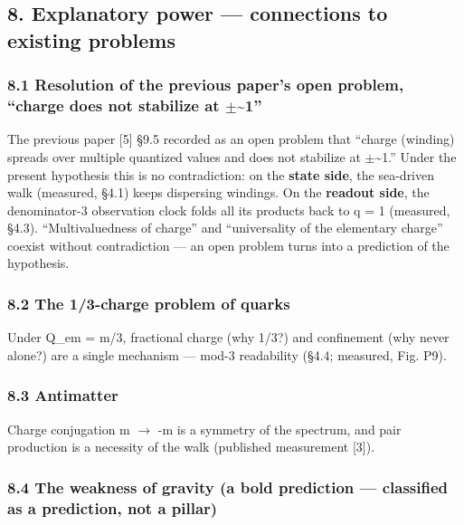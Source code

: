\documentclass[
]{article}
\begin{document}
\subsection{8. Explanatory power --- connections to existing
problems}\label{explanatory-power-connections-to-existing-problems}

\subsubsection{\texorpdfstring{8.1 Resolution of the previous paper's
open problem, ``charge does not stabilize at
\(\pm\)\textasciitilde1''}{8.1 Resolution of the previous paper's open problem, ``charge does not stabilize at \textbackslash pm\textasciitilde1''}}\label{resolution-of-the-previous-papers-open-problem-charge-does-not-stabilize-at-pm1}

The previous paper {[}5{]} §9.5 recorded as an open problem that
``charge (winding) spreads over multiple quantized values and does not
stabilize at \(\pm\)\textasciitilde1.'' Under the present hypothesis
this is no contradiction: on the \textbf{state side}, the sea-driven
walk (measured, §4.1) keeps dispersing windings. On the \textbf{readout
side}, the denominator-3 observation clock folds all its products back
to \textbar q\textbar{} = 1 (measured, §4.3). ``Multivaluedness of
charge'' and ``universality of the elementary charge'' coexist without
contradiction --- an open problem turns into a prediction of the
hypothesis.

\subsubsection{8.2 The 1/3-charge problem of
quarks}\label{the-13-charge-problem-of-quarks}

Under Q\_em = m/3, fractional charge (why 1/3?) and confinement (why
never alone?) are a single mechanism --- mod-3 readability (§4.4;
measured, Fig. P9).

\subsubsection{8.3 Antimatter}\label{antimatter}

Charge conjugation m \(\to\) -m is a symmetry of the spectrum, and pair
production is a necessity of the walk (published measurement {[}3{]}).

\subsubsection{8.4 The weakness of gravity (a bold prediction ---
classified as a prediction, not a
pillar)}\label{the-weakness-of-gravity-a-bold-prediction-classified-as-a-prediction-not-a-pillar}
\end{document}
